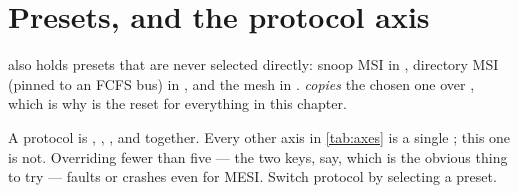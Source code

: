 \section{Presets, and the protocol axis}

 also holds presets that are never selected directly:
snoop MSI in , directory MSI (pinned to an FCFS bus) in
, and the mesh in .
 \emph{copies} the chosen one over ,
which is why  is the reset for everything in this chapter.

\begin{trapbox}
A protocol is , ,
,  and
 together. Every other axis in \cref{tab:axes} is a single
; this one is not. Overriding fewer than five --- the two  keys,
say, which is the obvious thing to try --- faults or crashes even for MESI. Switch protocol by
selecting a preset.
\end{trapbox}

